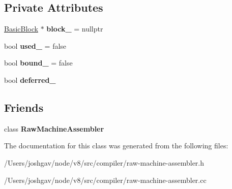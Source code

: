 \subsection*{Private Attributes}
\begin{DoxyCompactItemize}
\item 
\hyperlink{classv8_1_1internal_1_1compiler_1_1_basic_block}{Basic\+Block} $\ast$ {\bfseries block\+\_\+} = nullptr\hypertarget{classv8_1_1internal_1_1compiler_1_1_raw_machine_label_a49cdba4e3386b9c6b36496f911ee0066}{}\label{classv8_1_1internal_1_1compiler_1_1_raw_machine_label_a49cdba4e3386b9c6b36496f911ee0066}

\item 
bool {\bfseries used\+\_\+} = false\hypertarget{classv8_1_1internal_1_1compiler_1_1_raw_machine_label_a9a2defe8755664ffe9a3b274676a03a8}{}\label{classv8_1_1internal_1_1compiler_1_1_raw_machine_label_a9a2defe8755664ffe9a3b274676a03a8}

\item 
bool {\bfseries bound\+\_\+} = false\hypertarget{classv8_1_1internal_1_1compiler_1_1_raw_machine_label_a4846a423da829919b81080ced781d444}{}\label{classv8_1_1internal_1_1compiler_1_1_raw_machine_label_a4846a423da829919b81080ced781d444}

\item 
bool {\bfseries deferred\+\_\+}\hypertarget{classv8_1_1internal_1_1compiler_1_1_raw_machine_label_aab7105098995b21030d113960a0fd104}{}\label{classv8_1_1internal_1_1compiler_1_1_raw_machine_label_aab7105098995b21030d113960a0fd104}

\end{DoxyCompactItemize}
\subsection*{Friends}
\begin{DoxyCompactItemize}
\item 
class {\bfseries Raw\+Machine\+Assembler}\hypertarget{classv8_1_1internal_1_1compiler_1_1_raw_machine_label_a14407edaf8af33febf237ed95c292a7a}{}\label{classv8_1_1internal_1_1compiler_1_1_raw_machine_label_a14407edaf8af33febf237ed95c292a7a}

\end{DoxyCompactItemize}


The documentation for this class was generated from the following files\+:\begin{DoxyCompactItemize}
\item 
/\+Users/joshgav/node/v8/src/compiler/raw-\/machine-\/assembler.\+h\item 
/\+Users/joshgav/node/v8/src/compiler/raw-\/machine-\/assembler.\+cc\end{DoxyCompactItemize}
